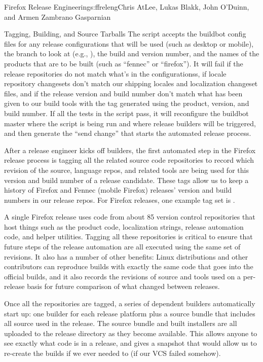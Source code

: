\begin{aosachapter}{Firefox Release Engineering}{s:ffreleng}{Chris AtLee, Lukas Blakk, John O'Duinn, and Armen Zambrano Gasparnian}
\begin{aosasect1}{Tagging, Building, and Source Tarballs}
The script accepts the buildbot config files for any release configurations
that will be used (such as desktop or mobile), the branch to look at (e.g.,
), the build and version number, and the names of the
products that are to be built (such as ``fennec'' or ``firefox''). It will fail if
the release repositories do not
match what's in the configurationss, if locale repository changesets don't
match our shipping locales and localization changeset files, and if the
release version and build number don't match what has been given to
our build tools with the tag generated using the product,
version, and build number. If all
the tests in the script pass, it will reconfigure the
buildbot master where the script is being run and where release
builders will be triggered, and then generate the ``send change'' that
starts the automated release process.

After a release engineer kicks off builders,
the first automated step in the Firefox release process is tagging all
the related source code repositories to record which revision of
the source, language repos, and related tools are being used for this
version and build number of a release candidate. 
These tags allow us
to keep a history of Firefox and Fennec (mobile Firefox) releases'
version and build numbers in our release repos.
For Firefox releases, one example tag set is
.  

A single Firefox
release uses code from about 85 version control repositories that host
things such as the product code, localization strings, release
automation code, and helper utilities. Tagging all these repositories
is critical to ensure that future steps of the release
automation are all executed using the same set of revisions. It also has a
number of other benefits: Linux distributions and other contributors
can reproduce builds with exactly the same code that goes into the
official builds, and it also records the revisions of source and tools
used on a per-release basis for future comparison of what changed
between releases. 
    
Once all the repositories are tagged, a series of dependent builders
automatically start up: one builder for each release platform plus a
source bundle that includes all source used in the release.  The source
bundle and built installers are all uploaded to the release directory
as they become available.  This allows anyone to see exactly what code
is in a release, and gives a snapshot that would allow us to re-create
the builds if we ever needed to (if our VCS failed somehow).
 

\end{aosasect1}
\end{aosachapter}
